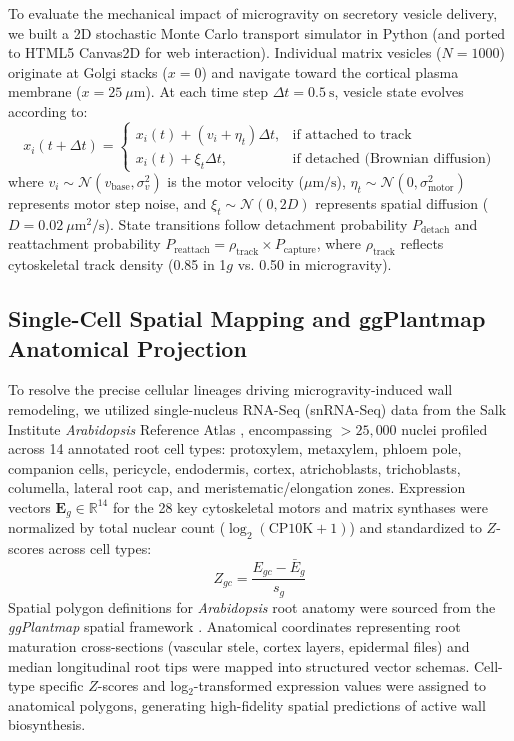 To evaluate the mechanical impact of microgravity on secretory vesicle delivery, we built a 2D stochastic Monte Carlo transport simulator in Python (and ported to HTML5 Canvas2D for web interaction). Individual matrix vesicles ($N = 1000$) originate at Golgi stacks ($x = 0$) and navigate toward the cortical plasma membrane ($x = 25~\mu\text{m}$). At each time step $\Delta t = 0.5~\text{s}$, vesicle state evolves according to:
\begin{equation}
    x_i(t + \Delta t) = 
    \begin{cases}
        x_i(t) + (v_i + \eta_t) \Delta t, & \text{if attached to track} \\
        x_i(t) + \xi_t \Delta t, & \text{if detached (Brownian diffusion)}
    \end{cases}
\end{equation}
where $v_i \sim \mathcal{N}(v_{\text{base}}, \sigma_v^2)$ is the motor velocity ($\mu\text{m/s}$), $\eta_t \sim \mathcal{N}(0, \sigma_{\text{motor}}^2)$ represents motor step noise, and $\xi_t \sim \mathcal{N}(0, 2D)$ represents spatial diffusion ($D = 0.02~\mu\text{m}^2/\text{s}$). State transitions follow detachment probability $P_{\text{detach}}$ and reattachment probability $P_{\text{reattach}} = \rho_{\text{track}} \times P_{\text{capture}}$, where $\rho_{\text{track}}$ reflects cytoskeletal track density (0.85 in 1$g$ vs. 0.50 in microgravity).

\subsection{Single-Cell Spatial Mapping and ggPlantmap Anatomical Projection}

To resolve the precise cellular lineages driving microgravity-induced wall remodeling, we utilized single-nucleus RNA-Seq (snRNA-Seq) data from the Salk Institute \textit{Arabidopsis} Reference Atlas \cite{Lee2025}, encompassing $>25,000$ nuclei profiled across 14 annotated root cell types: protoxylem, metaxylem, phloem pole, companion cells, pericycle, endodermis, cortex, atrichoblasts, trichoblasts, columella, lateral root cap, and meristematic/elongation zones. Expression vectors $\mathbf{E}_g \in \mathbb{R}^{14}$ for the 28 key cytoskeletal motors and matrix synthases were normalized by total nuclear count ($\log_2(\text{CP10K} + 1)$) and standardized to $Z$-scores across cell types:
\begin{equation}
    Z_{gc} = \frac{E_{gc} - \bar{E}_g}{s_g}
\end{equation}
Spatial polygon definitions for \textit{Arabidopsis} root anatomy were sourced from the \textit{ggPlantmap} spatial framework \cite{Lee2025}. Anatomical coordinates representing root maturation cross-sections (vascular stele, cortex layers, epidermal files) and median longitudinal root tips were mapped into structured vector schemas. Cell-type specific $Z$-scores and log$_2$-transformed expression values were assigned to anatomical polygons, generating high-fidelity spatial predictions of active wall biosynthesis.


